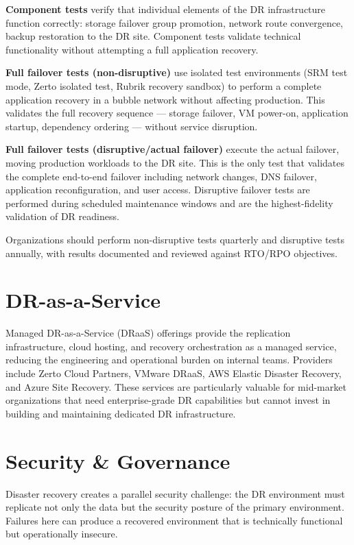 \textbf{Component tests} verify that individual elements of the DR infrastructure function correctly: storage failover group promotion, network route convergence, backup restoration to the DR site. Component tests validate technical functionality without attempting a full application recovery.

\textbf{Full failover tests (non-disruptive)} use isolated test environments (SRM test mode, Zerto isolated test, Rubrik recovery sandbox) to perform a complete application recovery in a bubble network without affecting production. This validates the full recovery sequence --- storage failover, VM power-on, application startup, dependency ordering --- without service disruption.

\textbf{Full failover tests (disruptive/actual failover)} execute the actual failover, moving production workloads to the DR site. This is the only test that validates the complete end-to-end failover including network changes, DNS failover, application reconfiguration, and user access. Disruptive failover tests are performed during scheduled maintenance windows and are the highest-fidelity validation of DR readiness.

Organizations should perform non-disruptive tests quarterly and disruptive tests annually, with results documented and reviewed against RTO/RPO objectives.

\section{DR-as-a-Service}
Managed DR-as-a-Service (DRaaS) offerings provide the replication infrastructure, cloud hosting, and recovery orchestration as a managed service, reducing the engineering and operational burden on internal teams. Providers include Zerto Cloud Partners, VMware DRaaS, AWS Elastic Disaster Recovery, and Azure Site Recovery. These services are particularly valuable for mid-market organizations that need enterprise-grade DR capabilities but cannot invest in building and maintaining dedicated DR infrastructure.

\section{Security \& Governance}
Disaster recovery creates a parallel security challenge: the DR environment must replicate not only the data but the security posture of the primary environment. Failures here can produce a recovered environment that is technically functional but operationally insecure.

